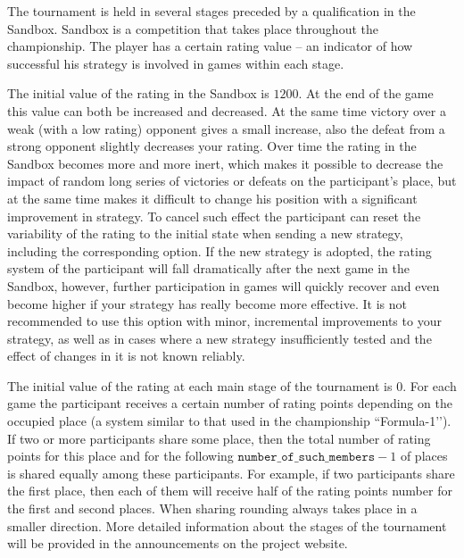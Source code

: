 The tournament is held in several stages preceded by a qualification in the Sandbox.
Sandbox is a competition that takes place throughout the championship.
The player has a certain rating value -- an indicator of how successful
his strategy is involved in games within each stage.

The initial value of the rating in the Sandbox is $1200$. At the end of the game this value can both be increased and decreased. At the same time victory
over a weak (with a low rating) opponent gives a small increase, also the defeat from a strong opponent slightly decreases your
rating. Over time the rating in the Sandbox becomes more and more inert, which makes it possible to decrease the impact of random long series of victories or
defeats on the participant's place, but at the same time makes it difficult to change his position with a significant improvement in strategy. To cancel such effect
the participant can reset the variability of the rating to the initial state when sending a new strategy, including the corresponding
option. If the new strategy is adopted, the rating system of the participant will fall dramatically after the next game in the Sandbox, however,
further participation in games will quickly recover and even become higher if your strategy has really become more effective. It is not recommended
to use this option with minor, incremental improvements to your strategy, as well as in cases where a new strategy
insufficiently tested and the effect of changes in it is not known reliably.

The initial value of the rating at each main stage of the tournament is $0$. For each game the participant receives a certain number of rating points
depending on the occupied place (a system similar to that used in the championship ``Formula-1’’). If two or more participants share
some place, then the total number of rating points for this place and for the following $\texttt{number\_of\_such\_members}-1$ of places is shared
equally among these participants. For example, if two participants share the first place, then each of them will receive half of the rating points number
for the first and second places. When sharing rounding always takes place in a smaller direction. More detailed information about the stages of the tournament will be
provided in the announcements on the project website.

